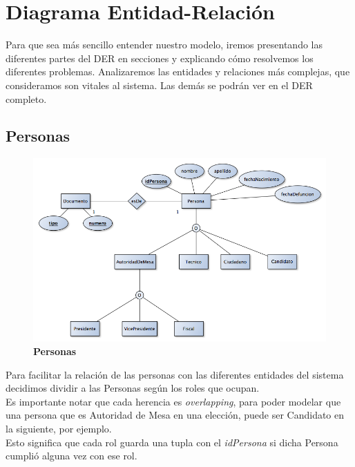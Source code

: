 \section{Diagrama Entidad-Relación}

Para que sea más sencillo entender nuestro modelo, iremos presentando las diferentes partes del DER en secciones y explicando cómo resolvemos los diferentes problemas. Analizaremos las entidades y relaciones más complejas, que consideramos son vitales al sistema. Las demás se podrán ver en el DER completo.\\

\subsection{Personas}
\begin{figure}[H]
   \begin{center}
   \includegraphics[scale=0.5]{graphics/der_personas.png}
   \caption{\textbf{Personas}}
   \label{fig:der}
   \end{center}
\end{figure}

Para facilitar la relación de las personas con las diferentes entidades del sistema decidimos dividir a las Personas según los roles que ocupan.\\

Es importante notar que cada herencia es \textit{overlapping}, para poder modelar que una persona que es Autoridad de Mesa en una elección, puede ser Candidato en la siguiente, por ejemplo.\\

Esto significa que cada rol guarda una tupla con el \textit{idPersona} si dicha Persona cumplió alguna vez con ese rol.\\

